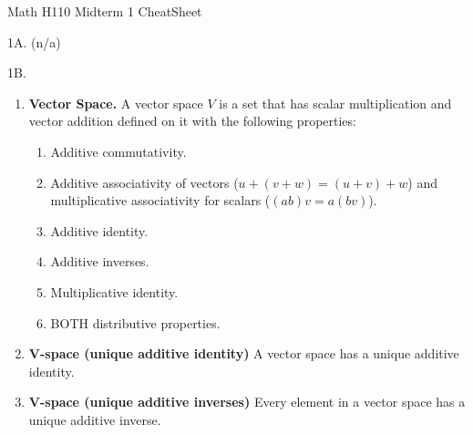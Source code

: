 \documentclass[12pt]{article}
\theoremstyle{definition}
\theoremstyle{named}
\begin{document}
\begin{center}
    Math H110 Midterm 1 CheatSheet 
\end{center}
1A. (n/a)

1B. 
\begin{enumerate}
	\item \textbf{Vector Space. } A vector space $V$ is a set that has scalar multiplication and vector addition defined on it with the following properties: 
	\begin{enumerate}
		\item Additive commutativity. 
		\item Additive associativity of vectors ($u+(v+w)=(u+v)+w$) and multiplicative associativity for scalars ($(ab)v = a(bv)$). 
		\item Additive identity. 
		\item Additive inverses. 
		\item Multiplicative identity. 
		\item BOTH distributive properties. 
	\end{enumerate}
	\item \textbf{V-space (unique additive identity) } A vector space has a unique additive identity. 
	\item \textbf{V-space (unique additive inverses) } Every element in a vector space has a unique additive inverse. 
\end{enumerate}
 
\end{document}
